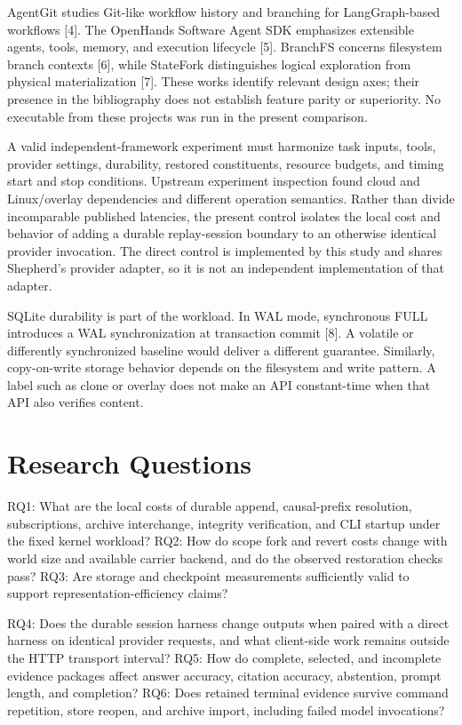 \documentclass[11pt,a4paper]{article}
\begin{document}
AgentGit studies Git-like workflow history and branching for LangGraph-based workflows [4]. The OpenHands Software Agent SDK emphasizes extensible agents, tools, memory, and execution lifecycle [5]. BranchFS concerns filesystem branch contexts [6], while StateFork distinguishes logical exploration from physical materialization [7]. These works identify relevant design axes; their presence in the bibliography does not establish feature parity or superiority. No executable from these projects was run in the present comparison.


A valid independent-framework experiment must harmonize task inputs, tools, provider settings, durability, restored constituents, resource budgets, and timing start and stop conditions. Upstream experiment inspection found cloud and Linux/overlay dependencies and different operation semantics. Rather than divide incomparable published latencies, the present control isolates the local cost and behavior of adding a durable replay-session boundary to an otherwise identical provider invocation. The direct control is implemented by this study and shares Shepherd's provider adapter, so it is not an independent implementation of that adapter.


SQLite durability is part of the workload. In WAL mode, synchronous FULL introduces a WAL synchronization at transaction commit [8]. A volatile or differently synchronized baseline would deliver a different guarantee. Similarly, copy-on-write storage behavior depends on the filesystem and write pattern. A label such as clone or overlay does not make an API constant-time when that API also verifies content.


\section{Research Questions}

RQ1: What are the local costs of durable append, causal-prefix resolution, subscriptions, archive interchange, integrity verification, and CLI startup under the fixed kernel workload? RQ2: How do scope fork and revert costs change with world size and available carrier backend, and do the observed restoration checks pass? RQ3: Are storage and checkpoint measurements sufficiently valid to support representation-efficiency claims?


RQ4: Does the durable session harness change outputs when paired with a direct harness on identical provider requests, and what client-side work remains outside the HTTP transport interval? RQ5: How do complete, selected, and incomplete evidence packages affect answer accuracy, citation accuracy, abstention, prompt length, and completion? RQ6: Does retained terminal evidence survive command repetition, store reopen, and archive import, including failed model invocations?
\end{document}
